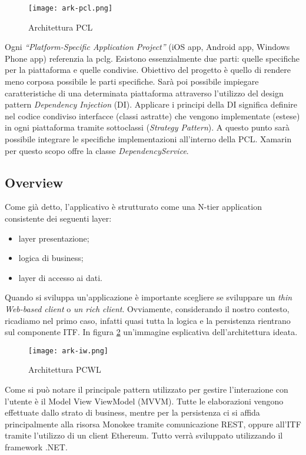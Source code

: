 \begin{figure}[!h]
    
    \centering
    \texttt{[image: ark-pcl.png]} 
    \caption{Architettura PCL}
    \label{fig:ark-pcl} 
\end{figure}

Ogni \emph{“Platform-Specific Application Project”} (iOS app, Android app, Windows Phone app) referenzia la \gls{pclg}. Esistono essenzialmente due parti: quelle specifiche per la piattaforma e quelle condivise. Obiettivo del progetto è quello di rendere meno corposa possibile le parti specifiche. Sarà poi possibile impiegare caratteristiche di una determinata piattaforma attraverso l’utilizzo del design pattern \emph{Dependency Injection} (DI).
Applicare i principi della DI significa definire nel codice condiviso interfacce (classi astratte) che vengono implementate (estese) in ogni piattaforma tramite sottoclassi (\emph{Strategy Pattern}). A questo punto sarà possibile integrare le specifiche implementazioni all’interno della PCL. Xamarin per questo scopo offre la classe \emph{DependencyService}.


\subsection{Overview}
Come già detto, l’applicativo è strutturato come una N-tier application consistente dei seguenti layer:
\begin{itemize}
    \item layer presentazione;
    \item logica di business;
    \item layer di accesso ai dati. 
\end{itemize}
    
Quando si sviluppa un’applicazione è importante scegliere se sviluppare un \emph{thin Web-based client} o \emph{un rich client}. Ovviamente, considerando il nostro contesto, ricadiamo nel primo caso, infatti quasi tutta la logica e la persistenza rientrano sul componente ITF. In figura \ref{fig:ark-iw} un'immagine esplicativa dell'architettura ideata.
\begin{figure}[htbp]
    
    \centering
    \texttt{[image: ark-iw.png]} 
    \caption{Architettura PCWL}
    \label{fig:ark-iw} 
\end{figure}
Come si può notare il principale pattern utilizzato per gestire l’interazione con l’utente è il Model View ViewModel (MVVM). Tutte le elaborazioni vengono effettuate dallo strato di business, mentre per la persistenza ci si affida principalmente alla risorsa Monokee tramite comunicazione REST, oppure all’ITF tramite l’utilizzo di un client Ethereum. Tutto verrà sviluppato utilizzando il framework .NET.
